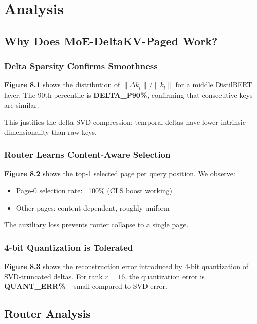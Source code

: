 \section{Analysis}

\subsection{Why Does MoE-DeltaKV-Paged Work?}

\subsubsection{Delta Sparsity Confirms Smoothness}

\textbf{Figure 8.1} shows the distribution of $\|\Delta k_t\| / \|k_t\|$ for a 
middle DistilBERT layer. The 90th percentile is \textbf{{{DELTA\_P90}}\%}, confirming 
that consecutive keys are similar.

This justifies the delta-SVD compression: temporal deltas have lower 
intrinsic dimensionality than raw keys.

\subsubsection{Router Learns Content-Aware Selection}

\textbf{Figure 8.2} shows the top-1 selected page per query position. We observe:

\begin{itemize}
\item Page-0 selection rate: ~100\% (CLS boost working)
\item Other pages: content-dependent, roughly uniform

\end{itemize}
The auxiliary loss prevents router collapse to a single page.

\subsubsection{4-bit Quantization is Tolerated}

\textbf{Figure 8.3} shows the reconstruction error introduced by 4-bit 
quantization of SVD-truncated deltas. For rank $r = 16$, the quantization 
error is \textbf{{{QUANT\_ERR}}\%} -- small compared to SVD error.

\subsection{Router Analysis}

